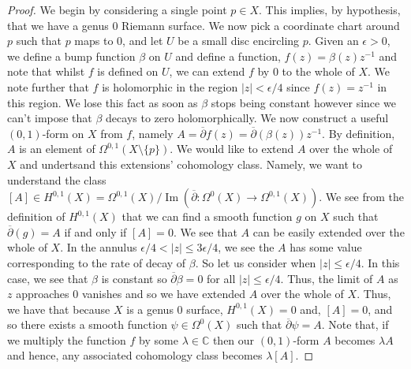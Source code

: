 \documentclass[11pt]{report}
\theoremstyle{definition}
\DeclareMathOperator{\im}{Im}
\begin{document}
\begin{proof}
  We begin by considering a single point $p \in X$. This implies, by hypothesis, that we have a genus $0$ Riemann surface. We now pick a coordinate chart around $p$ such that $p$ maps to $0$, and let $U$ be a small disc encircling $p$. Given an $\epsilon > 0$, we define a bump function $\beta$ on $U$ and define a function, $f(z) = \beta(z)z^{-1}$ and note that whilst $f$ is defined on $U$, we can extend $f$ by $0$ to the whole of $X$. We note further that $f$ is holomorphic in the region $|z| < \epsilon/4$ since $f(z) = z^{-1}$ in this region. We lose this fact as soon as $\beta$ stops being constant however since we can't impose that $\beta$ decays to zero holomorphically. We now construct a useful $(0,1)$-form on $X$ from $f$, namely $A=\overline{\partial}f(z) = \overline{\partial}(\beta(z))z^{-1}$.
  By definition, $A$ is an element of $\Omega^{0,1}(X\setminus \{p\})$. We would like to extend $A$ over the whole of $X$ and undertsand this extensions' cohomology class. Namely, we want to understand the class $[A] \in H^{0,1}(X)=\Omega^{0,1}(X)/\im(\overline{\partial}:\Omega^0(X) \rightarrow \Omega^{0,1}(X))$. \newline
  We see from the definition of $H^{0,1}(X)$ that we can find a smooth function $g$ on $X$ such that $\overline{\partial}(g) = A$ if and only if $[A] = 0$.  We see that $A$ can be easily extended over the whole of $X$. In the annulus $\epsilon /4 < |z| \leq 3\epsilon /4$, we see the $A$ has some value corresponding to the rate of decay of $\beta$. So let us consider when $|z| \leq \epsilon /4$. In this case, we see that $\beta$ is constant so $\overline{\partial}\beta = 0$ for all $|z| \leq \epsilon /4$. Thus, the limit of $A$ as $z$ approaches $0$ vanishes and so we have extended $A$ over the whole of $X$. Thus, we have that because $X$ is a genus $0$ surface, $H^{0,1}(X)=0$ and, $[A] = 0$, and so there exists a smooth function $\psi \in \Omega^0(X)$ such that $\overline{\partial}\psi = A$. Note that, if we multiply the function $f$ by some $\lambda \in \mathbb{C}$ then our $(0,1)$-form $A$ becomes $\lambda A$ and hence, any associated cohomology class becomes $\lambda[A]$.


\end{proof}
\end{document}
